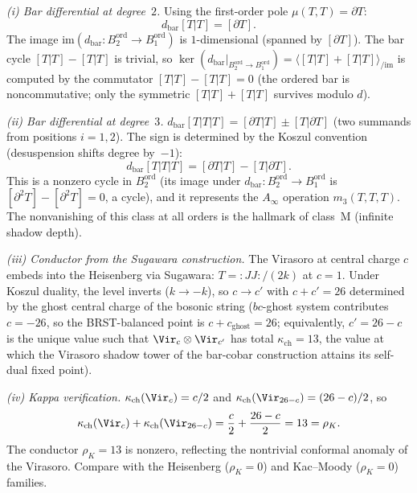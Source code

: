 \begin{remark}
\label{rem:koszul-virasoro-evidence}
\emph{(i) Bar differential at degree~$2$.}
Using the first-order pole $\mu(T, T) = \partial T$:
\[
 d_{\mathrm{bar}}[T|T] = [\partial T].
\]
The image $\mathrm{im}(d_{\mathrm{bar}}\colon B^{\mathrm{ord}}_2 \to
B^{\mathrm{ord}}_1)$ is $1$-dimensional (spanned by $[\partial T]$).
The bar cycle $[T|T] - [T|T]$ is trivial, so
$\ker(d_{\mathrm{bar}}|_{B^{\mathrm{ord}}_2 \to B^{\mathrm{ord}}_1}) =
\langle [T|T] + [T|T] \rangle_{/\mathrm{im}}$ is
computed by the commutator $[T|T] - [T|T] = 0$ (the ordered bar is
noncommutative; only the symmetric $[T|T] + [T|T]$ survives modulo $d$).

\emph{(ii) Bar differential at degree~$3$.}
$d_{\mathrm{bar}}[T|T|T] = [\partial T|T] \pm [T|\partial T]$
(two summands from positions $i = 1, 2$). The sign is determined by the
Koszul convention (desuspension shifts degree by~$-1$):
\[
 d_{\mathrm{bar}}[T|T|T] = [\partial T|T] - [T|\partial T].
\]
This is a nonzero cycle in $B^{\mathrm{ord}}_2$ (its image under
$d_{\mathrm{bar}}\colon B^{\mathrm{ord}}_2 \to B^{\mathrm{ord}}_1$ is
$[\partial^2 T] - [\partial^2 T] = 0$, a cycle), and it
represents the $A_\infty$ operation $m_3(T, T, T)$. The nonvanishing of
this class at all orders is the hallmark of class~M (infinite shadow
depth).

\emph{(iii) Conductor from the Sugawara construction.}
The Virasoro at central charge $c$ embeds into the Heisenberg via
Sugawara: $T = :JJ:/(2k)$ at $c = 1$. Under Koszul duality, the level
inverts ($k \to -k$), so $c \to c'$ with $c + c' = 26$ determined by the
ghost central charge of the bosonic string ($bc$-ghost system contributes
$c = -26$, so the BRST-balanced point is $c + c_{\mathrm{ghost}} = 26$;
equivalently, $c' = 26 - c$ is the unique value such that
$\Vir_c \otimes \Vir_{c'}$ has total $\kappa_{\mathrm{ch}} = 13$, the value
at which the Virasoro shadow tower of the bar-cobar construction attains
its self-dual fixed point).

\emph{(iv) Kappa verification.}
$\kappa_{\mathrm{ch}}(\Vir_c) = c/2$ and
$\kappa_{\mathrm{ch}}(\Vir_{26-c}) = (26-c)/2$, so
\[
 \kappa_{\mathrm{ch}}(\Vir_c) + \kappa_{\mathrm{ch}}(\Vir_{26-c})
 = \frac{c}{2} + \frac{26-c}{2} = 13 = \rho_K.
\]
The conductor $\rho_K = 13$ is nonzero, reflecting the nontrivial
conformal anomaly of the Virasoro. Compare with the Heisenberg
($\rho_K = 0$) and Kac--Moody ($\rho_K = 0$) families.
\end{remark}

